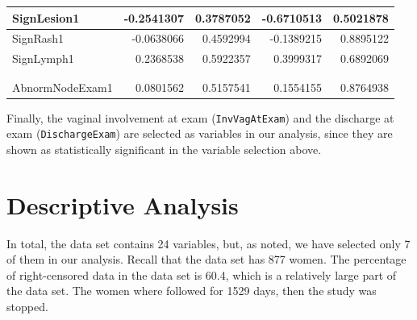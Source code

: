 \documentclass[
]{article}
\begin{document}
\begin{table}
\begin{tabular}[t]{l|r|r|r|r}
\hline
SignLesion1 & -0.2541307 & 0.3787052 & -0.6710513 & 0.5021878\\
\hline
SignRash1 & -0.0638066 & 0.4592994 & -0.1389215 & 0.8895122\\
\hline
SignLymph1 & 0.2368538 & 0.5922357 & 0.3999317 & 0.6892069\\
\hline
\cellcolor{blue}{\textcolor{white}{InvVagAtExam1}} & \cellcolor{blue}{\textcolor{white}{0.5726933}} & \cellcolor{blue}{\textcolor{white}{0.2003764}} & \cellcolor{blue}{\textcolor{white}{2.8580874}} & \cellcolor{blue}{\textcolor{white}{0.0042620}}\\
\hline
\cellcolor{blue}{\textcolor{white}{DischargeExam1}} & \cellcolor{blue}{\textcolor{white}{-0.5805191}} & \cellcolor{blue}{\textcolor{white}{0.2691414}} & \cellcolor{blue}{\textcolor{white}{-2.1569301}} & \cellcolor{blue}{\textcolor{white}{0.0310111}}\\
\hline
AbnormNodeExam1 & 0.0801562 & 0.5157541 & 0.1554155 & 0.8764938\\
\hline
\end{tabular}
\end{table}

Finally, the vaginal involvement at exam (\texttt{InvVagAtExam}) and the discharge at exam (\texttt{DischargeExam}) are selected as variables in our analysis, since they are shown as statistically significant in the variable selection above.

\hypertarget{descriptive-analysis}{%
\section{Descriptive Analysis}\label{descriptive-analysis}}

In total, the data set contains 24 variables, but, as noted, we have selected only 7 of them in our analysis. Recall that the data set has 877 women. The percentage of right-censored data in the data set is 60.4, which is a relatively large part of the data set. The women where followed for 1529 days, then the study was stopped.
\end{document}
